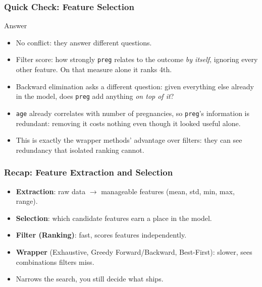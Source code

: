 \begin{frame}[fragile]\frametitle{Quick Check: Feature Selection}
\begin{block}{Answer}
\begin{itemize}
\item No conflict: they answer different questions.
\item Filter score: how strongly \texttt{preg} relates to the outcome \emph{by itself}, ignoring every other feature. On that measure alone it ranks 4th.
\item Backward elimination asks a different question: given everything else already in the model, does \texttt{preg} add anything \emph{on top of it}?
\item \texttt{age} already correlates with number of pregnancies, so \texttt{preg}'s information is redundant: removing it costs nothing even though it looked useful alone.
\item This is exactly the wrapper methods' advantage over filters: they can see redundancy that isolated ranking cannot.
\end{itemize}
\end{block}
\end{frame}

\begin{frame}[fragile]\frametitle{Recap: Feature Extraction and Selection}
\begin{itemize}
\item \textbf{Extraction}: raw data $\to$ manageable features (mean, std, min, max, range).
\item \textbf{Selection}: which candidate features earn a place in the model.
\item \textbf{Filter (Ranking)}: fast, scores features independently.
\item \textbf{Wrapper} (Exhaustive, Greedy Forward/Backward, Best-First): slower, sees combinations filters miss.
\item Narrows the search, you still decide what ships.
\end{itemize}
\end{frame}
